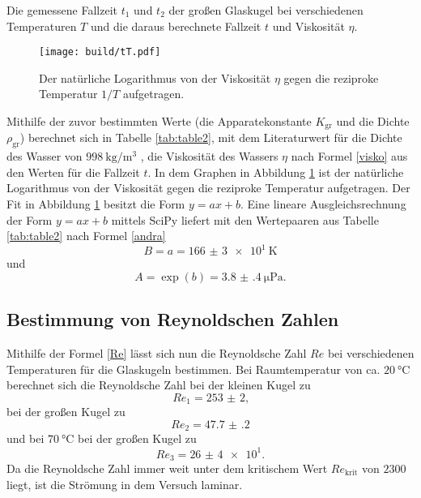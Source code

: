 \begin{table}
	\centering
	\caption{Die gemessene Fallzeit $t_1$ und $t_2$ der großen Glaskugel bei verschiedenen Temperaturen $T$ und die daraus berechnete Fallzeit $t$ und Viskosität $\eta$.}
	
\end{table}
\begin{figure}
	\centering
	\caption{Der natürliche Logarithmus von der Viskosität $\eta$ gegen die reziproke Temperatur $1/T$ aufgetragen.}
	\texttt{[image: build/tT.pdf]}
	\label{fig:Graph}
\end{figure}
Mithilfe der zuvor bestimmten Werte (die Apparatekonstante $K_\text{gr}$ und die Dichte $\rho_\text{gr}$) berechnet sich in Tabelle \ref{tab:table2}, mit dem Literaturwert für die Dichte des Wasser von $\SI{998}{\kilo\gram\per\meter\tothe{3}}$ \cite{eta}, die Viskosität des Wassers $\eta$ nach Formel \eqref{visko} aus den Werten für die Fallzeit $t$. In dem Graphen in Abbildung \ref{fig:Graph} ist der natürliche Logarithmus von der Viskosität gegen die reziproke Temperatur aufgetragen.
Der Fit in Abbildung \ref{fig:Graph} besitzt die Form $y=a x + b$. Eine lineare Ausgleichsrechnung der Form $y=a x + b$ mittels SciPy \cite{scipy} liefert mit den Wertepaaren aus Tabelle \ref{tab:table2} nach Formel \eqref{andra}
\begin{displaymath}
	B = a = \SI{166(3)e1}{\kelvin}
\end{displaymath}
und
\begin{displaymath}
	A = \exp(b) = \SI{3.8(4)}{\micro\pascal}\text{.}
\end{displaymath}

\subsection{Bestimmung von Reynoldschen Zahlen}
Mithilfe der Formel \eqref{Re} lässt sich nun die Reynoldsche Zahl $Re$ bei verschiedenen Temperaturen für die Glaskugeln bestimmen. Bei Raumtemperatur von ca. $\SI{20}{\degreeCelsius}$ berechnet sich die Reynoldsche Zahl bei der kleinen Kugel zu
\begin{displaymath}
	Re_1 = \num{253(2)}\text{,}
\end{displaymath}
 bei der großen Kugel zu
\begin{displaymath}
	Re_2 = \num{47.7(2)}
\end{displaymath}
und bei $\SI{70}{\degreeCelsius}$ bei der großen Kugel zu
\begin{displaymath}
Re_3 = \num{26(4)e1}\text{.}
\end{displaymath}
Da die Reynoldsche Zahl immer weit unter dem kritischem Wert $Re_\text{krit}$ von $2300$ \cite{Rekrit} liegt, ist die Strömung in dem Versuch laminar. 
